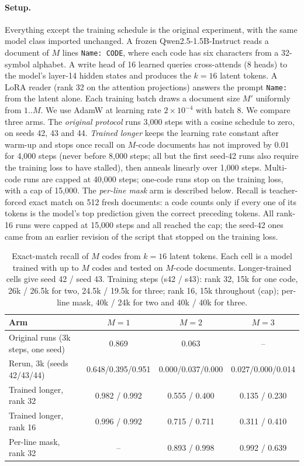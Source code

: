 \paragraph{Setup.} Everything except the training schedule is the original experiment, with the same model class imported unchanged. A frozen Qwen2.5-1.5B-Instruct reads a document of $M$ lines \texttt{Name: CODE}, where each code has six characters from a 32-symbol alphabet. A write head of 16 learned queries cross-attends (8 heads) to the model's layer-14 hidden states and produces the $k{=}16$ latent tokens. A LoRA reader (rank 32 on the attention projections) answers the prompt \texttt{Name:} from the latent alone. Each training batch draws a document size $M'$ uniformly from $1..M$. We use AdamW at learning rate $2{\times}10^{-4}$ with batch 8. We compare three arms. The \emph{original protocol} runs 3{,}000 steps with a cosine schedule to zero, on seeds 42, 43 and 44. \emph{Trained longer} keeps the learning rate constant after warm-up and stops once recall on $M$-code documents has not improved by $0.01$ for 4{,}000 steps (never before 8{,}000 steps; all but the first seed-42 runs also require the training loss to have stalled), then anneals linearly over 1{,}000 steps. Multi-code runs are capped at 40{,}000 steps; one-code runs stop on the training loss, with a cap of 15{,}000. The \emph{per-line mask} arm is described below. Recall is teacher-forced exact match on 512 fresh documents: a code counts only if every one of its tokens is the model's top prediction given the correct preceding tokens. All rank-16 runs were capped at 15{,}000 steps and all reached the cap; the seed-42 ones came from an earlier revision of the script that stopped on the training loss.

\begin{table}[h]
\small\centering
\caption{Exact-match recall of $M$ codes from $k{=}16$ latent tokens. Each cell is a model trained with up to $M$ codes and tested on $M$-code documents. Longer-trained cells give seed 42 / seed 43. Training steps (s42 / s43): rank 32, 15k for one code, 26k / 26.5k for two, 24.5k / 19.5k for three; rank 16, 15k throughout (cap); per-line mask, 40k / 24k for two and 40k / 40k for three.}
\label{tab:binding}
\begin{tabular}{@{}lccc@{}}
\toprule
\textbf{Arm} & $M{=}1$ & $M{=}2$ & $M{=}3$ \\
\midrule
Original runs (3k steps, one seed) & 0.869 & 0.063 & -- \\
Rerun, 3k (seeds 42/43/44) & 0.648/0.395/0.951 & 0.000/0.037/0.000 & 0.027/0.000/0.014 \\
Trained longer, rank 32 & 0.982 / 0.992 & 0.555 / 0.400 & 0.135 / 0.230 \\
Trained longer, rank 16 & 0.996 / 0.992 & 0.715 / 0.711 & 0.311 / 0.410 \\
Per-line mask, rank 32 & -- & 0.893 / 0.998 & 0.992 / 0.639 \\
\bottomrule
\end{tabular}
\end{table}

